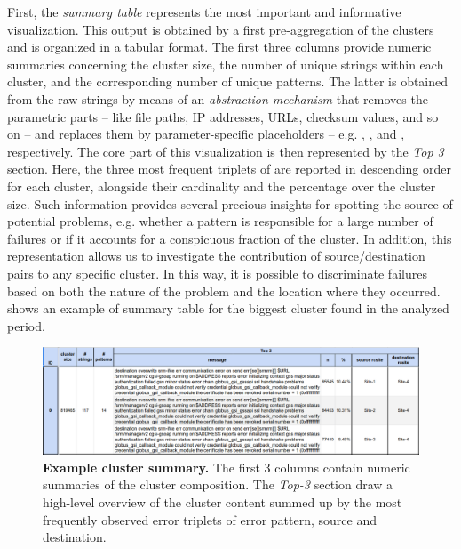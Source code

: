 First, the \textit{summary table} represents the most important and informative visualization.
This output is obtained by a first pre-aggregation of the clusters and is organized in a tabular format.
The first three columns provide numeric summaries concerning the  cluster size, the number of unique strings within each cluster, and the corresponding number of unique patterns.
The latter is obtained from the raw strings by means of an \textit{abstraction mechanism} that removes the parametric parts -- like file paths, IP addresses, URLs, checksum values, and so on -- and replaces them by parameter-specific placeholders -- e.g. , ,  and  , respectively.
The core part of this visualization is then represented by the \textit{Top 3} section. Here, the three most frequent triplets of  are reported in descending order for each cluster, alongside their cardinality and the percentage over the cluster size.
Such information provides several precious insights for spotting the source of potential problems, e.g. whether a pattern is responsible for a large number of failures or if it accounts for a conspicuous fraction of the cluster. 
In addition, this representation allows us to investigate the contribution of source/destination pairs to any specific cluster.
In this way, it is possible to discriminate failures based on both the nature of the problem and the location where they occurred.
 shows an example of summary table for the biggest cluster found in the analyzed period.

\begin{landscape}
    \begin{figure}
        \centering
        \includegraphics[width=\linewidth]{figures/410_method/cluster0_wide.png}
        \caption{ \textbf{Example cluster summary.}
        The first 3 columns contain numeric summaries of the cluster composition. The \textit{Top-3} section draw a high-level overview of the cluster content summed up by the most frequently observed error triplets of error pattern, source and destination.
        }
        \label{fig:cluster0}
    \end{figure}
\end{landscape}

